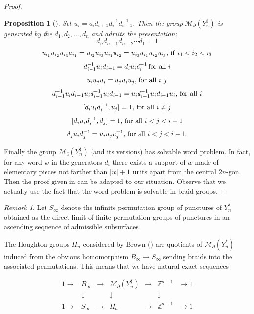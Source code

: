 \documentclass[twoside]{irmaems}
\theoremstyle{plain}
\newtheorem{proposition}[theorem]{Proposition}
\theoremstyle{definition}
\theoremstyle{remark}
\newtheorem{remark}[theorem]{Remark}
\newcommand{\Z}{{\mathbb{Z}}}
\begin{document}
\begin{proof}
\begin{proposition}[\cite{fu}]
 Set  $u_i=d_{i}d_{i+1}d_{i}^{-1}d_{i+1}^{-1}$. Then the group  
${\mathcal M}_{\partial}(Y_n^{\sharp})$ is generated by the $d_1,d_2,\ldots,d_n$ and admits the presentation: 
\[ d_nd_{n-1}d_{n-2}\cdots d_1=1\]
\[ u_{i_1}u_{i_2}u_{i_3}u_{i_1}=u_{i_2}u_{i_3}u_{i_1}u_{i_2}=
u_{i_3}u_{i_1}u_{i_2}u_{i_3}, {\rm \, if \,}\,  i_1 <i_2 <i_3\]  
\[ d_{i-1}^{-1}u_id_{i-1}=d_{i}u_id_{i}^{-1} \, {\rm for \,\, all }\,\,  i\]
\[ u_iu_ju_i=u_ju_iu_j, \,{\rm for \,\, all }\,\,  i,j \]
\[ d_{i-1}^{-1}u_id_{i-1} u_i  d_{i-1}^{-1}u_id_{i-1}=
u_id_{i-1}^{-1}u_id_{i-1} u_i, \,{\rm for \,\, all }\,\,  i\]
\[ [d_{i}u_id_{i}^{-1}, u_j]= 1, \,{\rm for \,\, all }\,\,  i\neq j \]
\[ [d_{i}u_id_{i}^{-1}, d_j]= 1, \,{\rm for \,\, all }\,\,  i <j< i-1 \]
\[ d_ju_id_j^{-1}=u_iu_ju_j^{-1}, \,{\rm for \,\, all }\,\,  i <j< i-1. \]
\end{proposition}
 
\vspace{0.2cm}
\noindent 
Finally the group ${\mathcal M}_{\partial}(Y_n^{\sharp})$ (and its versions) 
has solvable word problem. In fact, 
for any word $w$ in the generators $d_i$ there exists a 
support of $w$ made of elementary pieces not farther than $|w|+1$ units  
apart from the central $2n$-gon. Then the proof given in \cite{fu-ka2} can be adapted 
to our situation. Observe that we actually use the fact that 
the word problem is solvable in braid groups.  
\end{proof}


\begin{remark}
Let $S_{\infty}$ denote the infinite permutation group of punctures 
of $Y_n^*$ obtained as the direct limit of 
finite permutation groups of punctures in an ascending sequence of 
admissible subsurfaces. 

\vspace{0.2cm}
\noindent 
The Houghton groups $H_n$ considered by Brown (\cite{br1}) are quotients of 
${\mathcal M}_{\partial}(Y_n^*)$ induced from the obvious 
homomorphism $B_{\infty}\to S_{\infty}$ sending braids into the 
associated permutations. This means that we have natural exact sequences 

\[ \begin{array}{ccccccc}
1 \to & B_{\infty} &\to& {\mathcal M}_{\partial}(Y_n^{\sharp})&\to &\Z^{n-1}&\to 1\\
      & \downarrow &   &  \downarrow &  & \downarrow & \\ 
1 \to & S_{\infty} &\to& H_n&\to &\Z^{n-1}&\to 1
\end{array}
\]
\end{remark}
\end{document}
